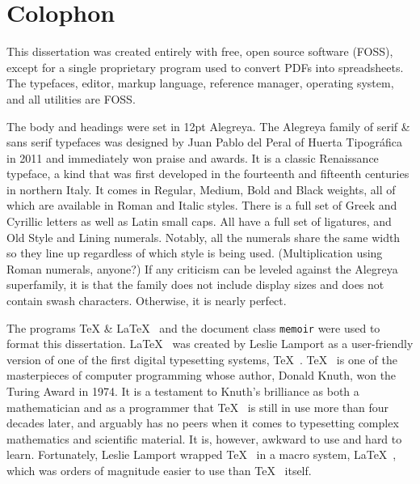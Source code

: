 
\chapter{Colophon}\indent\small\OnehalfSpacing%

This dissertation was created entirely with free, open source software (FOSS), except for a single proprietary program used to convert PDFs into spreadsheets. The typefaces, editor, markup language, reference manager, operating system, and all utilities are FOSS. 
\begin{center}
  \textbf{\qquad{}\qquad{}\qquad{}\qquad{}}
\end{center}
The body and headings were set in 12pt Alegreya. The Alegreya family of serif \& sans serif typefaces was designed by Juan Pablo del Peral of Huerta Tipográfica in 2011 and immediately won praise and awards. It is a classic Renaissance typeface, a kind that was first developed in the fourteenth and fifteenth centuries in northern Italy. It comes in Regular, Medium, Bold and Black weights, all of which are available in Roman and Italic styles. There is a full set of Greek and Cyrillic letters as well as Latin small caps. All have a full set of ligatures, and Old Style and Lining numerals. Notably, all the numerals share the same width so they line up regardless of which style is being used. (Multiplication using Roman numerals, anyone?) If any criticism can be leveled against the Alegreya superfamily, it is that the family does not include display sizes and does not contain swash characters. Otherwise, it is nearly perfect.
\begin{center}
  \textbf{\quad\quad{}\quad\quad{}\quad\quad{}\quad\quad{}}
\end{center}
The programs \TeX{} \& \LaTeX{}  and the document class \texttt{memoir} were used to format this dissertation. \LaTeX  was created by Leslie Lamport as a user-friendly version of one of the first digital typesetting systems, \TeX . \TeX  is one of the masterpieces of computer programming whose author, Donald Knuth, won the Turing Award in 1974. It is a testament to Knuth's brilliance as both a mathematician and as a programmer that \TeX  is still in use more than four decades later, and arguably has no peers when it comes to typesetting complex mathematics and scientific material. It is, however, awkward to use and hard to learn. Fortunately, Leslie Lamport wrapped \TeX  in a macro system, \LaTeX , which was orders of magnitude easier to use than \TeX  itself.

